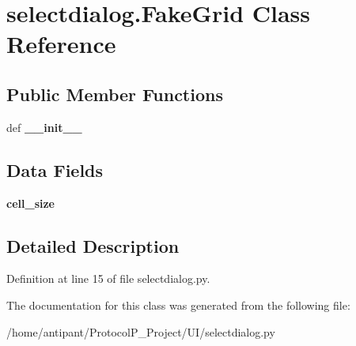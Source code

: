 \hypertarget{classselectdialog_1_1FakeGrid}{\section{selectdialog.\-Fake\-Grid Class Reference}
\label{classselectdialog_1_1FakeGrid}
}
\subsection*{Public Member Functions}
\begin{DoxyCompactItemize}
\item 
\hypertarget{classselectdialog_1_1FakeGrid_a26985d20b0d787dd6a4bccdb5d2860e4}{def {\bfseries \-\_\-\-\_\-init\-\_\-\-\_\-}}\label{classselectdialog_1_1FakeGrid_a26985d20b0d787dd6a4bccdb5d2860e4}

\end{DoxyCompactItemize}
\subsection*{Data Fields}
\begin{DoxyCompactItemize}
\item 
\hypertarget{classselectdialog_1_1FakeGrid_ae40bba21382e64de5caaf2985c373127}{{\bfseries cell\-\_\-size}}\label{classselectdialog_1_1FakeGrid_ae40bba21382e64de5caaf2985c373127}

\end{DoxyCompactItemize}


\subsection{Detailed Description}


Definition at line 15 of file selectdialog.\-py.



The documentation for this class was generated from the following file\-:\begin{DoxyCompactItemize}
\item 
/home/antipant/\-Protocol\-P\-\_\-\-Project/\-U\-I/selectdialog.\-py\end{DoxyCompactItemize}
